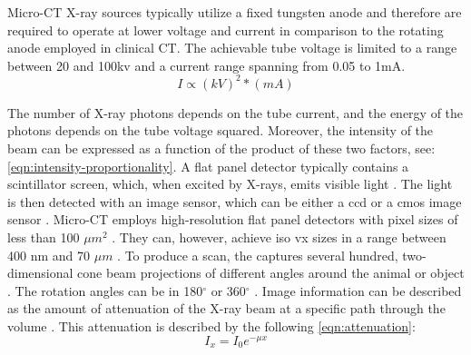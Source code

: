 \noindent
Micro-CT X-ray sources typically utilize a fixed tungsten anode
and therefore are required to operate at lower voltage and current in comparison to the rotating anode employed in clinical CT.
The achievable tube voltage is limited to a range between 20 and 100\acrshort{kv} and a current range spanning from 0.05 to 1mA.
\begin{equation}\label{eqn:intensity-proportionality}
	I \propto (kV)^{2}*(mA)
\end{equation}

\noindent
The number of X-ray photons depends on the tube current, and the energy of the photons depends on the tube voltage squared.
Moreover, the intensity of the beam can be expressed as a function of the product of these two factors, see: \cref{eqn:intensity-proportionality}.
A flat panel detector typically contains a scintillator screen, which, when excited by X-rays, emits visible light \cite{babaComparisonFlatpanelDetector2002,ritmanCurrentStatusDevelopments2011,clarkMicroCTRodentsStateart2014}.
The light is then detected with an image sensor, which can be either a \acrfull{ccd} or a \acrfull{cmos} image sensor \cite{babaComparisonFlatpanelDetector2002}.
Micro-CT employs high-resolution flat panel detectors with pixel sizes of less than 100 $\mu m^{2}$ \cite{clarkAdvancesMicroCTImaging2021,clarkMicroCTRodentsStateart2014}.
They can, however, achieve \gls{iso} \gls{vx} sizes in a range between 400 nm and 70 $\mu m$ \cite{orhanMicrocomputedTomographyMicroCT2020}.
To produce a scan, the \mct\space captures several hundred, two-dimensional cone beam projections of different angles around the animal or object \cite{clarkMicroCTRodentsStateart2014,ritmanCurrentStatusDevelopments2011,clarkAdvancesMicroCTImaging2021}.
The rotation angles can be in 180$^{\circ}$ or 360$^{\circ}$ \cite{orhanMicrocomputedTomographyMicroCT2020}.
Image information can be described as the amount of attenuation of the X-ray beam at a specific path through the volume \cite{orhanMicrocomputedTomographyMicroCT2020}.
This attenuation is described by the following \cref{eqn:attenuation}:
\begin{equation}\label{eqn:attenuation}
	I_{x} = I_{0}e^{- \mu x}
\end{equation}

